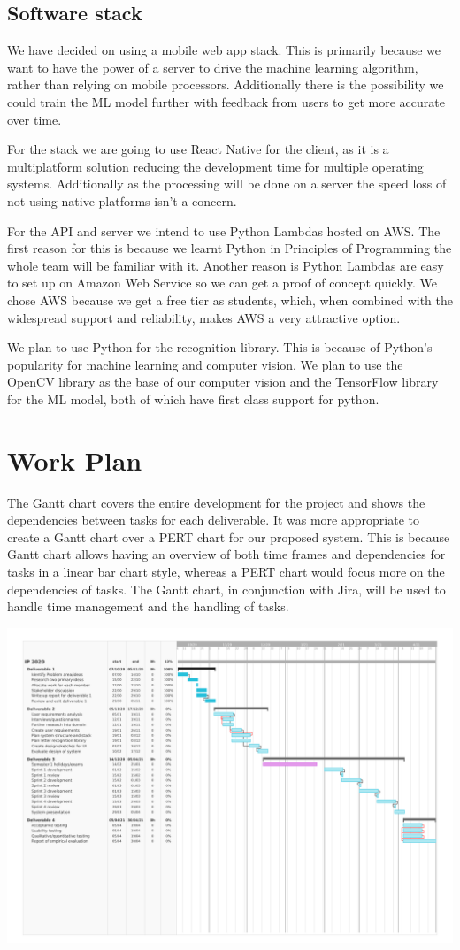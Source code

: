 \documentclass[10pt]{article}
\begin{document}
\subsection{Software stack}

We have decided on using a mobile web app stack. This is primarily because we want to have the power of a server to drive the machine learning algorithm, rather than relying on mobile processors. Additionally there is the possibility we could train the ML model further with feedback from users to get more accurate over time.

For the stack we are going to use React Native for the client, as it is a multiplatform solution reducing the development time for multiple operating systems. Additionally as the processing will be done on a server the speed loss of not using native platforms isn’t a concern.

For the API and server we intend to use Python Lambdas hosted on AWS. The first reason for this is because we learnt Python in Principles of Programming the whole team will be familiar with it. Another reason is Python Lambdas are easy to set up on Amazon Web Service so we can get a proof of concept quickly. We chose AWS because we get a free tier as students, which, when combined with the widespread support and reliability, makes AWS a very attractive option.

We plan to use Python for the recognition library. This is because of Python’s popularity for machine learning and computer vision. We plan to use the OpenCV library as the base of our computer vision and the TensorFlow library for the ML model, both of which have first class support for python.


\section{Work Plan}

The Gantt chart covers the entire development for the project and shows the dependencies between 
tasks for each deliverable. It was more appropriate to create a Gantt chart over a PERT chart for 
our proposed system. This is because Gantt chart allows having an overview of both time frames and 
dependencies for tasks in a linear bar chart style, whereas a PERT chart would focus more on the 
dependencies of tasks. The Gantt chart, in conjunction with Jira, will be used to handle time 
management and the handling of tasks.

\includegraphics[width=\textwidth]{IpGantt.png}



\end{document}
